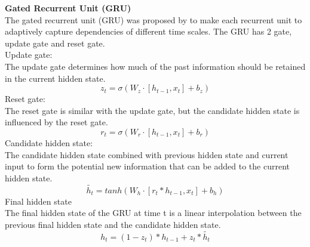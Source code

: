 \documentclass[12pt,a4paper]{article}
\begin{document}
\newpage
\textbf{Gated Recurrent Unit (GRU)}
\\[1ex]
The gated recurrent unit (GRU) was proposed by \parencite{cho2014properties} to make each recurrent unit to adaptively capture dependencies of different time scales. The GRU has 2 gate, update gate and reset gate. 
\\[2ex]
Update gate:
\\[1ex]
The update gate determines how much of the past information should be retained in the current hidden state. 
\begin{equation}
    z_t = \sigma(W_z \cdot [ h_{t-1} , x_t ] + b_z )
\end{equation}
Reset gate:
\\[1ex]
The reset gate is similar with the update gate, but the candidate hidden state is influenced by the reset gate. 
\begin{equation}
    r_t = \sigma( W_r \cdot [ h_{t-1} , x_t ] + b_r )
\end{equation}
Candidate hidden state:
\\[1ex]
The candidate hidden state combined with previous hidden state and current input to form the potential new information that can be added to the current hidden state.
\begin{equation}
    \widetilde{h_t} = tanh ( W_h \cdot [ r_t * h_{t-1} , x_t ] + b_h )
\end{equation}
Final hidden state
\\[1ex]
The final hidden state of the GRU at time t is a linear interpolation between the previous final hidden state and the candidate hidden state. 
\begin{equation}
    h_t = ( 1 - z_t ) * h_{t-1} + z_t * \widetilde{ h_t }
\end{equation}
\end{document}

